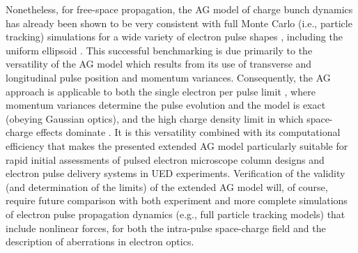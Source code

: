 Nonetheless, for free-space propagation, the AG model of charge bunch dynamics has already been shown to be very consistent with full Monte Carlo (i.e., particle tracking) simulations for a wide variety of electron pulse shapes \cite{michalik_analytic_2006,michalik_evolution_2009}, including the uniform ellipsoid \cite{luiten_how_2004}.
This successful benchmarking is due primarily to the versatility of the AG model which results from its use of transverse and longitudinal pulse position and momentum variances.
Consequently, the AG approach is applicable to both the single electron per pulse limit \cite{lobastov_four-dimensional_2005}, where momentum variances determine the pulse evolution and the model is exact (obeying Gaussian optics), and the high charge density limit in which space-charge effects dominate \cite{luiten_how_2004,siwick_ultrafast_2002,cao_femtosecond_2003}.
It is this versatility combined with its computational efficiency that makes the presented extended AG model particularly suitable for rapid initial assessments of pulsed electron microscope column designs and electron pulse delivery systems in UED experiments.
Verification of the validity (and determination of the limits) of the extended AG model will, of course, require future comparison with both experiment and more complete simulations of electron pulse propagation dynamics (e.g., full particle tracking models) that include nonlinear forces, for both the intra-pulse space-charge field and the description of aberrations in electron optics.

